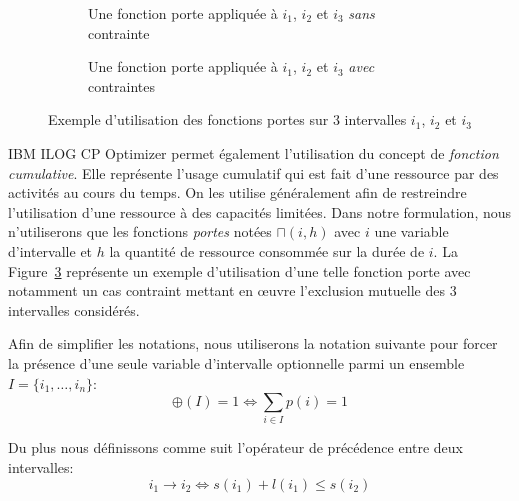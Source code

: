 \documentclass[main.tex]{subfiles}
\begin{document}
\begin{figure}
    \centering
    \begin{subfigure}[b]{\linewidth}
        \centering
        \scalebox{0.9}{}
        \caption{Une fonction porte appliquée à $i_1$, $i_2$ et $i_3$ \emph{sans} contrainte}
        \label{fig_resumeFr_pulseFunctionNoConst}
    \end{subfigure}\vspace{5mm}
    \begin{subfigure}[b]{\linewidth}
        \centering
        \scalebox{0.9}{}
        \caption{Une fonction porte appliquée à $i_1$, $i_2$ et $i_3$ \emph{avec} contraintes}
        \label{fig_resumeFr_pulseFunctionWithConst}
    \end{subfigure}
    \caption{Exemple d'utilisation des fonctions portes sur 3 intervalles $i_1$, $i_2$ et $i_3$}
    \label{fig_resumeFr_pulseFunction}
\end{figure}

IBM ILOG CP Optimizer permet également l'utilisation du concept de \emph{fonction cumulative}. Elle représente l'usage cumulatif qui est fait d'une ressource par des activités au cours du temps. On les utilise généralement afin de restreindre l'utilisation d'une ressource à des capacités limitées. Dans notre formulation, nous n'utiliserons que les fonctions \emph{portes} notées $\sqcap(i, h)$ avec $i$ une variable d'intervalle et $h$ la quantité de ressource consommée sur la durée de $i$. La Figure~\ref{fig_resumeFr_pulseFunction} représente un exemple d'utilisation d'une telle fonction porte avec notamment un cas contraint mettant en \oe{}uvre l'exclusion mutuelle des 3 intervalles considérés. 

Afin de simplifier les notations, nous utiliserons la notation suivante pour forcer la présence d'une seule variable d'intervalle optionnelle parmi un ensemble $I = \{ i_1 , \ldots , i_n \}$:
        \begin{displaymath}
            \oplus(I)=1 \Leftrightarrow \underset{i \in I}{\sum} p(i) = 1
        \end{displaymath}

Du plus nous définissons comme suit l'opérateur de précédence entre deux intervalles:
        \begin{displaymath}
            i_1 \to i_2 \Leftrightarrow s(i_1) + l(i_1) \leq s(i_2)
        \end{displaymath}
\end{document}
